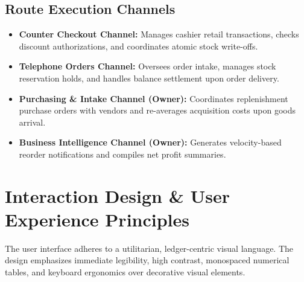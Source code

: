 \documentclass[12pt, a4paper]{report}
\begin{document}
\section{Route Execution Channels}
\begin{itemize}[leftmargin=1.5em]
  \item \textbf{Counter Checkout Channel:} Manages cashier retail transactions, checks discount authorizations, and coordinates atomic stock write-offs.
  \item \textbf{Telephone Orders Channel:} Oversees order intake, manages stock reservation holds, and handles balance settlement upon order delivery.
  \item \textbf{Purchasing \& Intake Channel (Owner):} Coordinates replenishment purchase orders with vendors and re-averages acquisition costs upon goods arrival.
  \item \textbf{Business Intelligence Channel (Owner):} Generates velocity-based reorder notifications and compiles net profit summaries.
\end{itemize}

\chapter{Interaction Design \& User Experience Principles}
The user interface adheres to a utilitarian, ledger-centric visual language. The design emphasizes immediate legibility, high contrast, monospaced numerical tables, and keyboard ergonomics over decorative visual elements.
\end{document}
